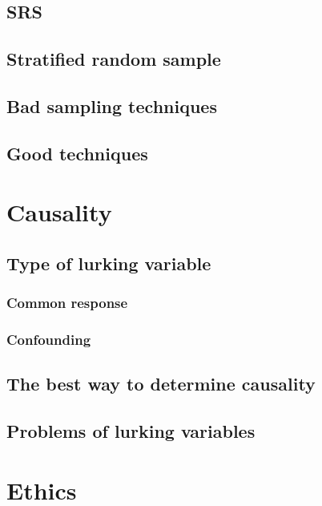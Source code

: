 \subsection{SRS}  %
\subsection{Stratified random sample}  %
\subsection{Bad sampling techniques}  %
\subsection{Good techniques}  %

\section{Causality}  %
\subsection{Type of lurking variable}  %
\subsubsection{Common response}  %
\subsubsection{Confounding}  %
\subsection{The best way to determine causality}  %
\subsection{Problems of lurking variables}  %

\section{Ethics}  %
